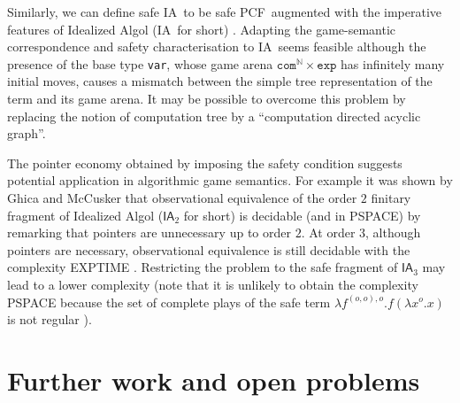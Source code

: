 \documentclass{llncs}
\newcommand\nat{\mathbb{N}}
\newcommand\ialgol{\textsf{IA}}
\newcommand\iacom{\texttt{com}}
\newcommand\iaexp{\texttt{exp}}
\newcommand\iavar{\texttt{var}}
\newcommand\pcf{\textsf{PCF}}
\begin{document}
Similarly, we can define safe \ialgol\ to be safe \pcf\ augmented with
the imperative features of Idealized Algol (\ialgol\ for short)
\cite{Reynolds81}.  Adapting the game-semantic correspondence and
safety characterisation to \ialgol\ seems feasible although the
presence of the base type \iavar, whose game arena $\iacom^{\nat}
\times \iaexp$ has infinitely many initial moves, causes a mismatch
between the simple tree representation of the term and its game
arena. It may be possible to overcome this problem by replacing the
notion of computation tree by a ``computation directed acyclic
graph''.

The pointer economy obtained by imposing the safety condition suggests
potential application in algorithmic game semantics.  For example it
was shown by Ghica and McCusker \cite{ghicamccusker00} that
observational equivalence of the order $2$ finitary fragment of
Idealized Algol ($\ialgol_2$ for short) is decidable (and in PSPACE)
by remarking that pointers are unnecessary up to order $2$. At order
$3$, although pointers are necessary, observational equivalence is
still decidable with the complexity EXPTIME
\cite{DBLP:conf/fossacs/MurawskiW05}. Restricting the problem to the
safe fragment of $\ialgol_3$ may lead to a lower complexity (note that
it is unlikely to obtain the complexity PSPACE because the set of
complete plays of the safe term $\lambda f^{(o,o),o} . f (\lambda x^o
. x)$ is not regular \cite{DBLP:journals/apal/Ong04}).




\section{Further work and open problems}
\end{document}
